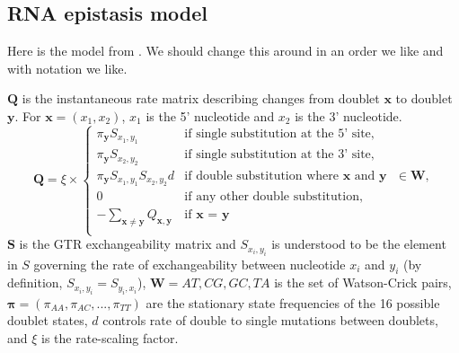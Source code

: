 \documentclass[11pt]{article}
\begin{document}
\subsection*{RNA epistasis model}

Here is the model from \cite{nasrallah2013phylogenetic}.
We should change this around in an order we like and with notation we like.

$\boldsymbol{Q}$ is the instantaneous rate matrix describing changes from doublet $\boldsymbol{x}$ to doublet $\boldsymbol{y}$.
For $\boldsymbol{x} = (x_1, x_2)$, $x_1$ is the 5' nucleotide and $x_2$ is the 3' nucleotide.
\begin{equation}
\label{eq:Q}
\boldsymbol{Q} = \xi \times
\begin{cases}
   \pi_{\boldsymbol{y}} S_{x_1, y_1} & \mbox{if single substitution at the 5' site,} \\
   \pi_{\boldsymbol{y}} S_{x_2, y_2} & \mbox{if single substitution at the 3' site,} \\
   \pi_{\boldsymbol{y}} S_{x_1, y_1} S_{x_2, y_2} d & \mbox{if double substitution where ${\boldsymbol{x}}$ and ${\boldsymbol{y}}$ $\in {\boldsymbol{W}}$,} \\
   0 & \mbox{if any other double substitution,} \\
   - \sum_{\boldsymbol{x} \ne \boldsymbol{y}} Q_{\boldsymbol{x},\boldsymbol{y}}& \mbox{if $\boldsymbol{x}$ = $\boldsymbol{y}$} \\
   \end{cases}
\end{equation}
$\boldsymbol{S}$ is the GTR exchangeability matrix \citep{tavare1986some} and $S_{x_i,y_i}$ is understood to be the element in $S$ governing the rate of exchangeability between nucleotide $x_i$ and $y_i$ (by definition, $S_{x_i,y_i} = S_{y_i,x_i}$),
${\boldsymbol{W}} = {AT, CG, GC, TA}$ is the set of Watson-Crick pairs,
$\boldsymbol{\pi} = (\pi_{AA}, \pi_{AC}, ..., \pi_{TT})$ are the stationary state frequencies of the 16 possible doublet states,
$d$ controls rate of double to single mutations between doublets,
and $\xi$ is the rate-scaling factor.
\end{document}

